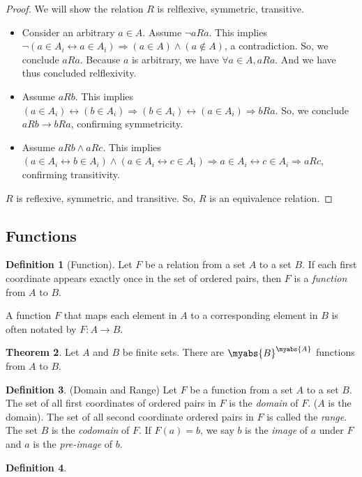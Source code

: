 \documentclass[11pt]{article}
\theoremstyle{definition}
\newtheorem{theorem}{Theorem}[section]
\newtheorem{definition}[theorem]{Definition}
\begin{document}
\begin{proof}
We will show the relation $R$ is relflexive, symmetric, transitive.
\begin{itemize}
    \item Consider an arbitrary $a \in A$. Assume $\lnot aRa$. This implies $\lnot(a \in A_i \leftrightarrow a \in A_i) \Rightarrow (a \in A) \land (a \notin A)$, a contradiction. So, we conclude $aRa$. Because $a$ is arbitrary, we have $\forall a \in A, aRa$. And we have thus concluded relflexivity.
    \item Assume $aRb$. This implies $(a \in A_i) \leftrightarrow (b \in A_i) \Rightarrow (b \in A_i) \leftrightarrow (a \in A_i) \Rightarrow bRa$. So, we conclude $aRb \rightarrow bRa$, confirming symmetricity.
    \item Assume $aRb \land aRc$. This implies $(a \in A_i \leftrightarrow b \in A_i) \land (a \in A_i \leftrightarrow c \in A_i) \Rightarrow a \in A_i \leftrightarrow c \in A_i \Rightarrow aRc$, confirming transitivity.
\end{itemize}
$R$ is reflexive, symmetric, and transitive. So, $R$ is an equivalence relation.
\end{proof}
\subsection{Functions}
\begin{definition}[Function]
Let $F$ be a relation from a set $A$ to a set $B$. If each first coordinate appears exactly once in the set of ordered pairs, then $F$ is a \emph{function} from $A$ to $B$.
\end{definition}
A function $F$ that maps each element in $A$ to a corresponding element in
$B$ is often notated by $F: A \rightarrow B$.
\begin{theorem}
    Let $A$ and $B$ be finite sets. There are $\myabs{B}^{\myabs{A}}$
    functions from $A$ to $B$.
\end{theorem}
\begin{definition}(Domain and Range)
    Let $F$ be a function from a set $A$ to a set $B$. The set of all first
    coordinates of ordered pairs in $F$ is the \emph{domain} of $F$. ($A$
    is the domain). The set of all second coordinate ordered pairs in $F$
    is called the \emph{range}. The set $B$ is the \emph{codomain} of $F$.
    If $F(a) = b$, we say $b$ is the \emph{image} of $a$ under $F$ and $a$
    is the \emph{pre-image} of $b$.
\end{definition}
\begin{definition}

\end{definition}
\end{document}
